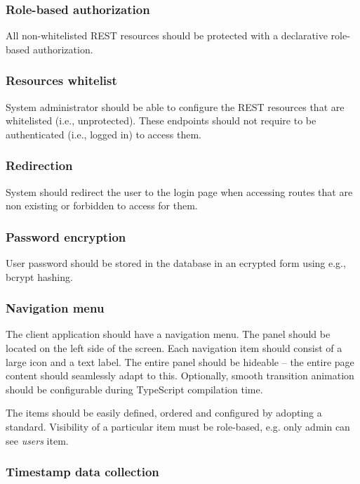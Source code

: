 \documentclass[a4paper,twoside,12pt]{book}
\begin{document}
\subsubsection{Role-based authorization}

All non-whitelisted REST resources should be protected with a declarative role-based authorization.

\subsubsection{Resources whitelist}

System administrator should be able to configure the REST resources that are whitelisted (i.e., unprotected). These endpoints should not require to be authenticated (i.e., logged in) to access them.

\subsubsection{Redirection}

System should redirect the user to the login page when accessing routes that are non existing or forbidden to access for them.

\subsubsection{Password encryption}

User password should be stored in the database in an ecrypted form using e.g., bcrypt hashing.

\subsubsection{Navigation menu}

The client application should have a navigation menu. The panel should be located on the left side of the screen. Each navigation item should consist of a large icon and a text label. The entire panel should be hideable – the entire page content should seamlessly adapt to this. Optionally, smooth transition animation should be configurable during TypeScript compilation time.

The items should be easily defined, ordered and configured by adopting a standard. Visibility of a particular item must be role-based, e.g. only admin can see \textit{users} item.

\subsubsection{Timestamp data collection}
\end{document}
